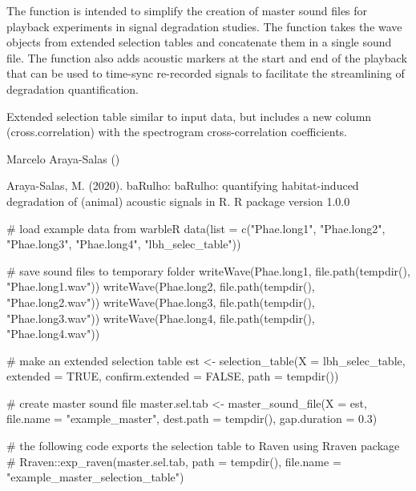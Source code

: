 \documentclass[letterpaper]{book}
\begin{document}
%
\begin{Details}\relax
The function is intended to simplify the creation of master sound files for playback experiments in signal degradation studies. The function takes the wave objects from extended selection tables and concatenate them in a single sound file. The function also adds acoustic markers at the start and end of the playback that can be used to time-sync re-recorded signals to facilitate the streamlining of degradation quantification.
\end{Details}
%
\begin{Value}
Extended selection table similar to input data, but includes a new column (cross.correlation)
with the spectrogram cross-correlation coefficients.
\end{Value}
%
\begin{Author}\relax
Marcelo Araya-Salas ()
\end{Author}
%
\begin{References}\relax

Araya-Salas, M. (2020). baRulho: baRulho: quantifying habitat-induced degradation of (animal) acoustic signals in R. R package version 1.0.0

\end{References}
%
\begin{SeeAlso}\relax
{}
\end{SeeAlso}
%
\begin{Examples}
\begin{ExampleCode}
{
# load example data from warbleR
data(list = c("Phae.long1", "Phae.long2", "Phae.long3", "Phae.long4", 
"lbh_selec_table"))

# save sound files to temporary folder
writeWave(Phae.long1, file.path(tempdir(), "Phae.long1.wav"))
writeWave(Phae.long2, file.path(tempdir(), "Phae.long2.wav"))
writeWave(Phae.long3, file.path(tempdir(), "Phae.long3.wav"))
writeWave(Phae.long4, file.path(tempdir(), "Phae.long4.wav"))

# make an extended selection table
est <- selection_table(X = lbh_selec_table, extended = TRUE, confirm.extended = FALSE, 
path = tempdir())

# create master sound file
master.sel.tab <- master_sound_file(X = est, file.name = "example_master", 
dest.path = tempdir(), gap.duration = 0.3)

# the following code exports the selection table to Raven using Rraven package
# Rraven::exp_raven(master.sel.tab, path = tempdir(), file.name = "example_master_selection_table")
}

\end{ExampleCode}
\end{Examples}
\end{document}
